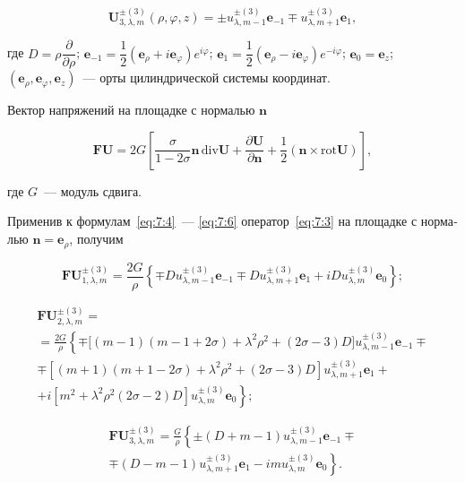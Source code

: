 \begin{russian}
\begin{equation}
\mathbf{U}_{3,\lambda,m}^{\pm(3)}(\rho,\varphi,z)=\pm u_{\lambda,m-1}^{\pm(3)}\mathbf{e}_{-1}\mp u_{\lambda,m+1}^{\pm(3)}\mathbf{e}_1,
\label{eq:7:6}
\end{equation}

\noindent где $D=\rho\dfrac{\partial}{\partial\rho}$; $\mathbf{e}_{-1}=\dfrac{1}{2}(\mathbf{e}_\rho+i\mathbf{e}_\varphi)e^{i\varphi}$; $\mathbf{e}_1=\dfrac{1}{2}(\mathbf{e}_\rho-i\mathbf{e}_\varphi)e^{-i\varphi}$; $\mathbf{e}_0=\mathbf{e}_z$; $(\mathbf{e}_\rho,\mathbf{e}_\varphi,\mathbf{e}_z)$~--- орты цилиндрической системы координат.

Вектор напряжений на площадке с нормалью $\mathbf{n}$

\begin{equation}
\mathbf{FU}=2G\left[\frac{\sigma}{1-2\sigma}\mathbf{n}\,\mathrm{div}\mathbf{U}+\frac{\partial\mathbf{U}}{\partial\mathbf{n}}+\frac{1}{2}(\mathbf{n}\times\mathrm{rot}\mathbf{U})\right],
\label{eq:7:3}
\end{equation}

\noindent где $G$~--- модуль сдвига.

Применив к формулам~\eqref{eq:7:4}~--- \eqref{eq:7:6} оператор~\eqref{eq:7:3} на площадке с нормалью $\mathbf{n}=\mathbf{e}_\rho$, получим

\begin{equation}
\mathbf{FU}_{1,\lambda,m}^{\pm(3)}=\frac{2G}{\rho}\left\{\mp Du_{\lambda,m-1}^{\pm(3)}\mathbf{e}_{-1}\mp Du_{\lambda,m+1}^{\pm(3)}\mathbf{e}_1+iDu_{\lambda,m}^{\pm(3)}\mathbf{e}_0\right\};
\end{equation}

\begin{multline}
\mathbf{FU}_{2,\lambda,m}^{\pm(3)}= \\
= \frac{2G}{\rho}\left\{\mp\Big[(m-1)(m-1+2\sigma)+\lambda^2\rho^2+(2\sigma-3)D\Big]u_{\lambda,m-1}^{\pm(3)}\mathbf{e}_{-1}\mp\right.\\
\mp[(m+1)(m+1-2\sigma)+\lambda^2\rho^2+(2\sigma-3)D]u_{\lambda,m+1}^{\pm(3)}\mathbf{e}_1+\\
\left.+i[m^2+\lambda^2\rho^2(2\sigma-2)D]u_{\lambda,m}^{\pm(3)}\mathbf{e}_0\right\};
\end{multline}

\begin{multline}
\mathbf{FU}_{3,\lambda,m}^{\pm(3)}=\frac{G}{\rho}\left\{\pm(D+m-1)u_{\lambda,m-1}^{\pm(3)}\mathbf{e}_{-1}\mp\right.\\
\left.\mp(D-m-1)u_{\lambda,m+1}^{\pm(3)}\mathbf{e}_1-imu_{\lambda,m}^{\pm(3)}\mathbf{e}_0\right\}.
\end{multline}


\end{russian}

